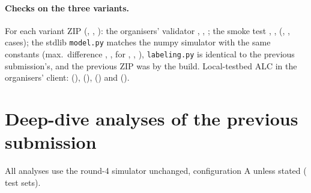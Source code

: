 \documentclass{article}
\begin{document}
\begin{table}[htbp]
\caption{Simulated populations (Table~\ref{tab:scenarios}) with all three variants: ALC and difference to the previous predictor, mean [95\% cluster-bootstrap CI over benchmarks]. Oracle: each pair's evaluation success rate as a constant. Source: \texttt{experiments/results/deep\_dive/proto\_level3.json}.}
\label{tab:scenariosfull}
\centering\footnotesize\setlength{\tabcolsep}{2.5pt}
\end{table}

\paragraph{Checks on the three variants.} For each variant ZIP (\SelId, \FmMhundId, \FmNosubjId): the organisers' validator \CkSelValidator, \CkMhundValidator, \CkNosubjValidator; the smoke test \CkSelSmokeOk, \CkMhundSmokeOk, \CkNosubjSmokeOk{} (\CkSelSmokeCases, \CkMhundSmokeCases, \CkNosubjSmokeCases{} cases); the stdlib \texttt{model.py} matches the numpy simulator with the same constants (max.\ difference \CkSelEquivMaxDiff, \CkMhundEquivMaxDiff, \CkNosubjEquivMaxDiff{} for \SelId{}, \FmMhundId{}, \FmNosubjId{}), \texttt{labeling.py} is identical to the previous submission's, and the previous ZIP was \CkSelShipZipUnchanged{} by the build. Local-testbed ALC in the organisers' client: \CkSelLoopAlc{} (\SelId{}), \CkMhundLoopAlc{} (\FmMhundId{}), \CkNosubjLoopAlc{} (\FmNosubjId{}) and \CkShipLoopAlc{} (\FmShipId{}).

\section{Deep-dive analyses of the previous submission}
\label{app:deepdive}

All analyses use the round-4 simulator unchanged, configuration A unless stated (\DdDiagNTestsets{} test sets).
\end{document}
